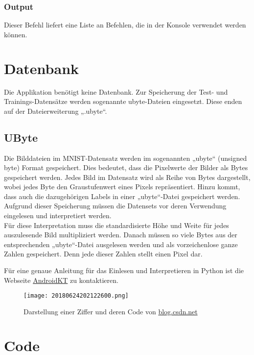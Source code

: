 \subsubsection{Output}
\label{sec:DesignHelpOutput}
Dieser Befehl liefert eine Liste an Befehlen, die in der Konsole verwendet werden können.

\section{Datenbank}
\label{sec:DesignDatenbank}
Die Applikation benötigt keine Datenbank. Zur Speicherung der Test- und Trainings-Datensätze werden sogenannte ubyte-Dateien eingesetzt. Diese enden auf der Dateierweiterung „.ubyte“.

\subsection{UByte}
\label{sec:UByte}
Die Bilddateien im MNIST-Datensatz werden im sogenannten „ubyte“ (unsigned byte) Format gespeichert. Dies bedeutet, dass die Pixelwerte der Bilder als Bytes gespeichert werden. Jedes Bild im Datensatz wird als Reihe von Bytes dargestellt, wobei jedes Byte den Graustufenwert eines Pixels repräsentiert. Hinzu kommt, dass auch die dazugehörigen Labels in einer „ubyte“-Datei gespeichert werden.
\\
Aufgrund dieser Speicherung müssen die Datensets vor deren Verwendung eingelesen und interpretiert werden. 
\\
Für diese Interpretation muss die standardisierte Höhe und Weite für jedes auszulesende Bild multipliziert werden. Danach müssen so viele Bytes aus der entsprechenden „ubyte“-Datei ausgelesen werden und als vorzeichenlose ganze Zahlen gespeichert. Denn jede dieser Zahlen stellt einen Pixel dar.

Für eine genaue Anleitung für das Einlesen und Interpretieren in Python ist die Webseite \href{https://androidkt.com/extract-images-from-mnist-idx3-ubyte-file-format-in-python/}{AndroidKT} zu kontaktieren.

\begin{figure}[H]
	\centering
	\texttt{[image: 20180624202122600.png]}
	\caption{Darstellung einer Ziffer und deren Code von \href{https://blog.csdn.net/qq_41185868/article/details/79094752}{blog.csdn.net}}
	\label{fig:designubytecomp}
\end{figure}



\section{Code}
\label{sec:DesignCode}
